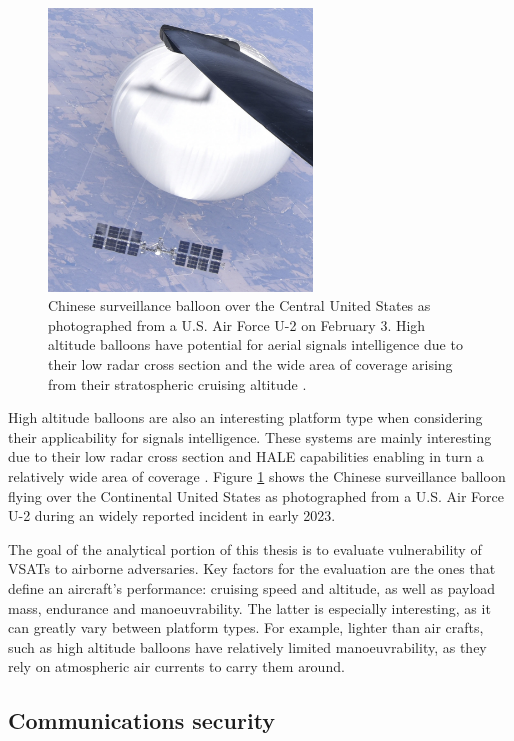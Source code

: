 \documentclass[english, 12pt, a4paper, elec, utf8, a-1b, online]{aaltothesis}
\begin{document}
\begin{figure}[h]
  \centering
  \includegraphics[width=70mm]{figures/U-2_Pilot_over_Central_Continental_United_States_(7644960)_(cropped).jpg}
  \caption{Chinese surveillance balloon over the Central United States as photographed from a U.S. Air Force U-2 on February 3. High altitude balloons have potential for aerial signals intelligence due to their low radar cross section and the wide area of coverage arising from their stratospheric cruising altitude \cite{tomme2005paradigm}.}
  \label{fig-chinese-balloon}
\end{figure}

High altitude balloons are also an interesting platform type when considering their applicability for signals intelligence. These systems are mainly interesting due to their low radar cross section and HALE capabilities enabling in turn a relatively wide area of coverage \cite{tomme2005paradigm}.
Figure \ref{fig-chinese-balloon} shows the Chinese surveillance balloon flying over the Continental United States as photographed from a U.S. Air Force U-2 during an widely reported incident in early 2023.

The goal of the analytical portion of this thesis is to evaluate vulnerability of VSATs to airborne adversaries.
Key factors for the evaluation are the ones that define an aircraft's performance: cruising speed and altitude, as well as payload mass, endurance and manoeuvrability.
The latter is especially interesting, as it can greatly vary between platform types.
For example, lighter than air crafts, such as high altitude balloons have relatively limited manoeuvrability, as they rely on atmospheric air currents to carry them around. %

\subsection{Communications security}
\end{document}
